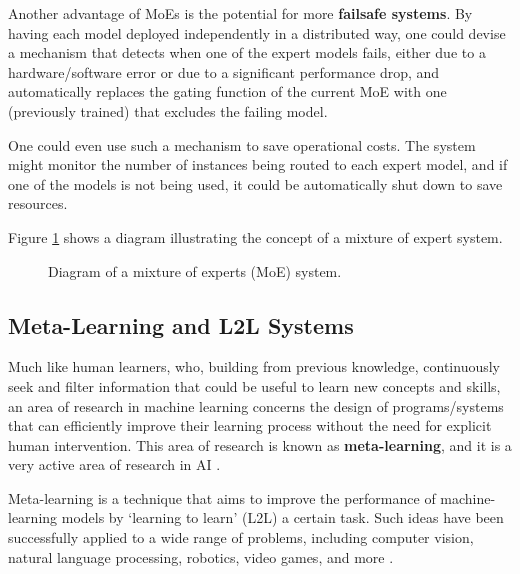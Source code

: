 \documentclass[../main.tex]{subfiles}
\begin{document}
    Another advantage of MoEs is the potential for more \textbf{failsafe systems}. By having each model deployed independently in a distributed way, one could devise a mechanism that detects when one of the expert models fails, either due to a hardware/software error or due to a significant performance drop, and automatically replaces the gating function of the current MoE with one (previously trained) that excludes the failing model.
    
    One could even use such a mechanism to save operational costs. The system might monitor the number of instances being routed to each expert model, and if one of the models is not being used, it could be automatically shut down to save resources.

    Figure \ref{fig:moes} shows a diagram illustrating the concept of a mixture of expert system.

    \begin{figure}[H]
        \centering
        \caption{Diagram of a mixture of experts (MoE) system.}
        \resizebox*{0.8\linewidth}{!}{
            
        }
        \label{fig:moes}
    \end{figure}

  
    \subsection{Meta-Learning and L2L Systems} \label{conclusions:research_directions:l2l} 

    Much like human learners, who, building from previous knowledge, continuously seek and filter information that could be useful to learn new concepts and skills, an area of research in machine learning concerns the design of programs/systems that can efficiently improve their learning process without the need for explicit human intervention. This area of research is known as \textbf{meta-learning}, and it is a very active area of research in AI .
    
    Meta-learning is a technique that aims to improve the performance of machine-learning models by `learning to learn' (L2L) a certain task. Such ideas have been successfully applied to a wide range of problems, including computer vision, natural language processing, robotics, video games, and more \cite{hospedales_meta-learning_2020}.
    
\end{document}
